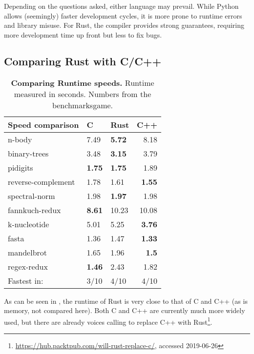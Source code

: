 Depending on the questions asked, either language may prevail. While Python
allows (seemingly) faster development cycles, it is more prone to runtime
errors and library misuse. For Rust, the compiler provides strong guarantees,
requiring more development time up front but less to fix bugs.



\subsection{Comparing Rust with C/C++}\label{sec:rustvscc++}

\begin{table}[ht]
\begin{tabular}{@{}lllr@{}}
    \textbf{Speed comparison} & C & Rust & C++ \\ \midrule
    n-body & 7.49 & \textbf{5.72} & 8.18 \\
    binary-trees & 3.48 & \textbf{3.15} & 3.79 \\
    pidigits & \textbf{1.75} & \textbf{1.75} & 1.89 \\
    reverse-complement & 1.78 & 1.61 & \textbf{1.55} \\
    spectral-norm & 1.98 & \textbf{1.97} & 1.98 \\
    fannkuch-redux & \textbf{8.61} & 10.23 & 10.08 \\
    k-nucleotide & 5.01 & 5.25 & \textbf{3.76} \\
    fasta & 1.36 & 1.47 & \textbf{1.33} \\
    mandelbrot & 1.65 & 1.96 & \textbf{1.5} \\
    regex-redux & \textbf{1.46} & 2.43 & 1.82 \\ \midrule
    Fastest in: & 3/10 & 4/10 & 4/10 \\
\end{tabular}
    \caption[Runtime Comparison Between Rust/C/C++]{\textbf{Comparing Runtime speeds.} Runtime measured in seconds. Numbers from the benchmarksgame\footnotemark.}
    \label{tab:runtime}
\end{table}


As can be seen in , the runtime of Rust is very close to
that of C and C++ (as is memory, not compared here). Both C and C++ are
currently much more widely used, but there are already voices calling to
replace C++ with
Rust\footnote{\url{https://hub.packtpub.com/will-rust-replace-c/}, accessed
2019-06-26}.


